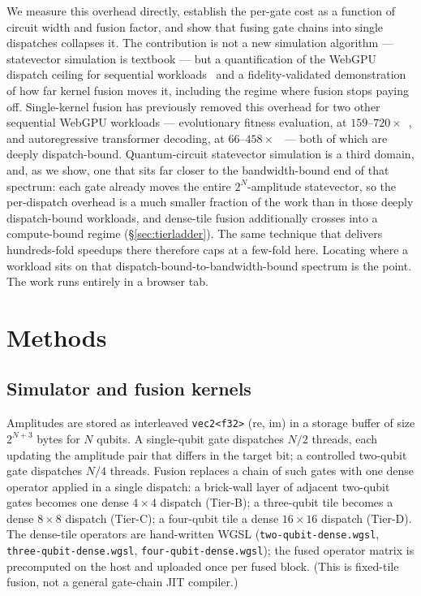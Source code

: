 \documentclass[11pt]{article}
\begin{document}
We measure this overhead directly, establish the per-gate cost as a function of
circuit width and fusion factor, and show that fusing gate chains into single
dispatches collapses it. The contribution is not a new simulation algorithm ---
statevector simulation is textbook --- but a quantification of the WebGPU
dispatch ceiling for sequential workloads~\cite{webgpudispatch} and a
fidelity-validated demonstration of how far kernel fusion moves it, including
the regime where fusion stops paying off. Single-kernel fusion has previously
removed this overhead for two other sequential WebGPU workloads --- evolutionary
fitness evaluation, at $159$--$720\times$~\cite{fusionfitness}, and
autoregressive transformer decoding, at $66$--$458\times$~\cite{fusiontransformer}
--- both of which are deeply dispatch-bound. Quantum-circuit statevector
simulation is a third domain, and, as we show, one that sits far closer to the
bandwidth-bound end of that spectrum: each gate already moves the entire
$2^N$-amplitude statevector, so the per-dispatch overhead is a much smaller
fraction of the work than in those deeply dispatch-bound workloads, and
dense-tile fusion additionally crosses into a compute-bound regime
(\S\ref{sec:tierladder}). The same technique that delivers hundreds-fold
speedups there therefore caps at a few-fold here. Locating where a workload sits
on that dispatch-bound-to-bandwidth-bound spectrum is the point. The work runs
entirely in a browser tab.

\section{Methods}

\subsection{Simulator and fusion kernels}

Amplitudes are stored as interleaved \texttt{vec2<f32>} (re, im) in a storage
buffer of size $2^{N+3}$ bytes for $N$ qubits. A single-qubit gate dispatches
$N/2$ threads, each updating the amplitude pair that differs in the target bit;
a controlled two-qubit gate dispatches $N/4$ threads. Fusion replaces a chain
of such gates with one dense operator applied in a single dispatch: a
brick-wall layer of adjacent two-qubit gates becomes one dense $4\times4$
dispatch (Tier-B); a three-qubit tile becomes a dense $8\times8$ dispatch
(Tier-C); a four-qubit tile a dense $16\times16$ dispatch (Tier-D). The
dense-tile operators are hand-written WGSL (\texttt{two-qubit-dense.wgsl},
\texttt{three-qubit-dense.wgsl}, \texttt{four-qubit-dense.wgsl}); the fused
operator matrix is precomputed on the host and uploaded once per fused block.
(This is fixed-tile fusion, not a general gate-chain JIT compiler.)
\end{document}
